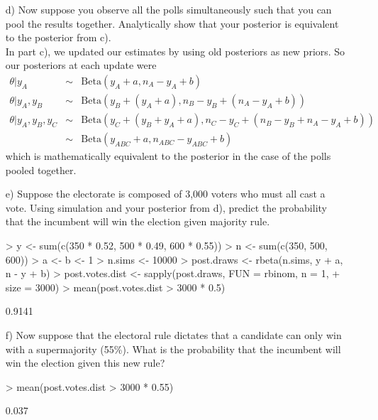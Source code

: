 \documentclass[10pt,a4paper]{article}
\newcommand{\red}{\color{red}}
\newcommand{\black}{\color{black}}
\begin{document}
\begin{enumerate}
\begin{itemize}
\item[d)] Now suppose you observe all the polls simultaneously such that you can pool the results together.  Analytically show that your posterior is equivalent to the posterior from c). \\

\medskip \red
In part c), we updated our estimates by using old posteriors as new priors.  So our posteriors at each update were
\begin{eqnarray*}
\theta | y_A &\sim& \mathrm{Beta}(y_A + a, n_A - y_A + b) \\
\theta | y_A, y_B &\sim& \mathrm{Beta}(y_B + (y_A + a), n_B - y_B + (n_A - y_A + b)) \\
\theta | y_A, y_B, y_C &\sim& \mathrm{Beta}(y_C + (y_B + y_A + a), n_C - y_C + (n_B - y_B + n_A - y_A + b)) \\
&\sim& \mathrm{Beta}(y_{ABC} + a, n_{ABC} - y_{ABC} + b)
\end{eqnarray*}
which is mathematically equivalent to the posterior in the case of the polls pooled together. \\
\medskip \black

\item[e)] Suppose the electorate is composed of 3,000 voters who must all cast a vote.  Using simulation and your posterior from d), predict the probability that the incumbent will win the election given majority rule. \\

\medskip \red \small
\begin{Schunk}
\begin{Sinput}
> y <- sum(c(350 * 0.52, 500 * 0.49, 600 * 0.55))
> n <- sum(c(350, 500, 600))
> a <- b <- 1
> n.sims <- 10000
> post.draws <- rbeta(n.sims, y + a, n - y + b)
> post.votes.dist <- sapply(post.draws, FUN = rbinom, n = 1, 
+     size = 3000)
> mean(post.votes.dist > 3000 * 0.5)
\end{Sinput}
\begin{Soutput}
[1] 0.9141
\end{Soutput}
\end{Schunk}
\normalsize \medskip \black

\item[f)] Now suppose that the electoral rule dictates that a candidate can only win with a supermajority (55\%).  What is the probability that the incumbent will win the election given this new rule? \\

\medskip \red \small
\begin{Schunk}
\begin{Sinput}
> mean(post.votes.dist > 3000 * 0.55)
\end{Sinput}
\begin{Soutput}
[1] 0.037
\end{Soutput}
\end{Schunk}
\normalsize \medskip \black
\end{itemize}


\end{enumerate}
\end{document}
